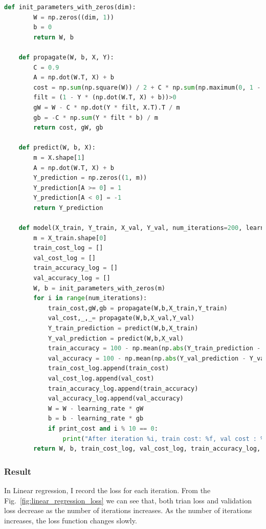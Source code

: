 \documentclass[journal, a4paper]{IEEEtran}
\begin{document}
\begin{lstlisting}[language=Python]
    def init_parameters_with_zeros(dim):
        W = np.zeros((dim, 1))
        b = 0
        return W, b

    def propagate(W, b, X, Y):
        C = 0.9
        A = np.dot(W.T, X) + b
        cost = np.sum(np.square(W)) / 2 + C * np.sum(np.maximum(0, 1 - Y * (np.dot(W.T, X) + b))) / m
        filt = (1 - Y * (np.dot(W.T, X) + b))>0
        gW = W - C * np.dot(Y * filt, X.T).T / m
        gb = -C * np.sum(Y * filt * b) / m
        return cost, gW, gb

    def predict(W, b, X):
        m = X.shape[1]
        A = np.dot(W.T, X) + b
        Y_prediction = np.zeros((1, m))
        Y_prediction[A >= 0] = 1
        Y_prediction[A < 0] = -1
        return Y_prediction

    def model(X_train, Y_train, X_val, Y_val, num_iterations=200, learning_rate=0.01, print_cost=False):
        m = X_train.shape[0]
        train_cost_log = []
        val_cost_log = []
        train_accuracy_log = []
        val_accuracy_log = []
        W, b = init_parameters_with_zeros(m)
        for i in range(num_iterations):
            train_cost,gW,gb = propagate(W,b,X_train,Y_train)
            val_cost,_,_= propagate(W,b,X_val,Y_val)
            Y_train_prediction = predict(W,b,X_train)
            Y_val_prediction = predict(W,b,X_val)
            train_accuracy = 100 - np.mean(np.abs(Y_train_prediction - Y_train) / 2) * 100
            val_accuracy = 100 - np.mean(np.abs(Y_val_prediction - Y_val) / 2) * 100
            train_cost_log.append(train_cost)
            val_cost_log.append(val_cost)
            train_accuracy_log.append(train_accuracy)
            val_accuracy_log.append(val_accuracy)
            W = W - learning_rate * gW
            b = b - learning_rate * gb
            if print_cost and i % 10 == 0:
                print("After iteration %i, train cost: %f, val cost : %f， train accuracy: %f %%, test accuracy: %f %%" % (i, train_cost, val_cost, train_accuracy, val_accuracy))
        return W, b, train_cost_log, val_cost_log, train_accuracy_log, val_accuracy_log
\end{lstlisting}



\subsubsection{Result}

In Linear regression, I record the loss for each iteration. 
From the Fig.~\ref{fig:linear_regression_loss} we can see that, both trian loss and validation loss decrease as the number of iterations increases.
As the number of iterations increases, the loss function changes slowly.
\end{document}
